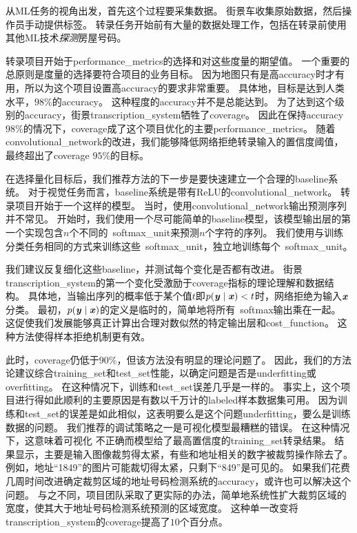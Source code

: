 
从\gls{ML}任务的视角出发，首先这个过程要采集数据。
街景车收集原始数据，然后操作员手动提供标签。
转录任务开始前有大量的数据处理工作，包括在转录前使用其他\gls{ML}技术\emph{探测}房屋号码。


转录项目开始于\gls{performance_metrics}的选择和对这些度量的期望值。
一个重要的总原则是度量的选择要符合项目的业务目标。
因为地图只有是高\gls{accuracy}时才有用，所以为这个项目设置高\gls{accuracy}的要求非常重要。
具体地，目标是达到人类水平，$98\%$的\gls{accuracy}。
这种程度的\gls{accuracy}并不是总能达到。
为了达到这个级别的\gls{accuracy}，街景\gls{transcription_system}牺牲了\gls{coverage}。
因此在保持\gls{accuracy} $98\%$的情况下，\gls{coverage}成了这个项目优化的主要\gls{performance_metrics}。
随着\gls{convolutional_network}的改进，我们能够降低网络拒绝转录输入的置信度阈值，最终超出了\gls{coverage} $95\%$的目标。


在选择量化目标后，我们推荐方法的下一步是要快速建立一个合理的\gls{baseline}系统。
对于视觉任务而言，\gls{baseline}系统是带有\gls{ReLU}的\gls{convolutional_network}。
转录项目开始于一个这样的模型。
当时，使用\gls{convolutional_network}输出预测序列并不常见。
开始时，我们使用一个尽可能简单的\gls{baseline}模型，该模型输出层的第一个实现包含$n$个不同的~\gls{softmax_unit}来预测$n$个字符的序列。
我们使用与训练分类任务相同的方式来训练这些~\gls{softmax_unit}，独立地训练每个~\gls{softmax_unit}。


我们建议反复细化这些\gls{baseline}，并测试每个变化是否都有改进。
街景\gls{transcription_system}的第一个变化受激励于\gls{coverage}指标的理论理解和数据结构。
具体地，当输出序列的概率低于某个值$t$即$p(\boldsymbol{\mathit{y}}\mid\boldsymbol{\mathit{x}}) < t$时，网络拒绝为输入$\boldsymbol{\mathit{x}}$分类。
最初，$p(\boldsymbol{\mathit{y}}\mid\boldsymbol{\mathit{x}})$的定义是临时的，简单地将所有~\gls{softmax}输出乘在一起。
这促使我们发展能够真正计算出合理对数似然的特定输出层和\gls{cost_function}。%
这种方法使得样本拒绝机制更有效。


此时，\gls{coverage}仍低于$90\%$，但该方法没有明显的理论问题了。
因此，我们的方法论建议综合\gls{training_set}和\gls{test_set}性能，以确定问题是否是\gls{underfitting}或\gls{overfitting}。
在这种情况下，训练和\gls{test_set}误差几乎是一样的。
事实上，这个项目进行得如此顺利的主要原因是有数以千万计的\gls{labeled}样本数据集可用。
因为训练和\gls{test_set}的误差是如此相似，这表明要么是这个问题\gls{underfitting}，要么是训练数据的问题。
我们推荐的调试策略之一是可视化模型最糟糕的错误。
在这种情况下，这意味着可视化 不正确而模型给了最高置信度的\gls{training_set}转录结果。
结果显示，主要是输入图像裁剪得太紧，有些和地址相关的数字被裁剪操作除去了。
例如，地址``1849''的图片可能裁切得太紧，只剩下``849''是可见的。
如果我们花费几周时间改进确定裁剪区域的地址号码检测系统的\gls{accuracy}，或许也可以解决这个问题。%
与之不同，项目团队采取了更实际的办法，简单地系统性扩大裁剪区域的宽度，使其大于地址号码检测系统预测的区域宽度。%
这种单一改变将\gls{transcription_system}的\gls{coverage}提高了$10$个百分点。

